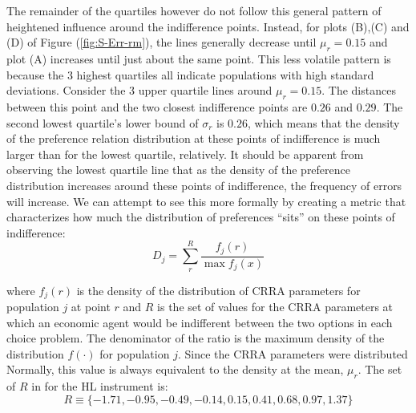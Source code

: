 \documentclass[11pt,a4paper]{article} %
\providecommand{\DIFaddbegin}{} %
\providecommand{\DIFaddend}{} %
\providecommand{\DIFdelbegin}{} %
\providecommand{\DIFdelend}{} %
\newcommand{\DIFscaledelfig}{0.5}
\newlength{\DIFdelgraphicswidth} %
\newlength{\DIFdelgraphicsheight} %
\newcommand{\DIFaddincludegraphics}[2][]{{\color{blue}\fbox{\DIFOincludegraphics[#1]{#2}}}} %
\newcommand{\DIFdelincludegraphics}[2][]{%
\sbox{\DIFdelgraphicsbox}{\DIFOincludegraphics[#1]{#2}}%
\settoboxwidth{\DIFdelgraphicswidth}{\DIFdelgraphicsbox} %
\settoboxtotalheight{\DIFdelgraphicsheight}{\DIFdelgraphicsbox} %
\scalebox{\DIFscaledelfig}{%
\parbox[b]{\DIFdelgraphicswidth}{\usebox{\DIFdelgraphicsbox}\\[-\baselineskip] \rule{\DIFdelgraphicswidth}{0em}}\llap{\resizebox{\DIFdelgraphicswidth}{\DIFdelgraphicsheight}{%
\setlength{\unitlength}{\DIFdelgraphicswidth}%
\begin{picture}(1,1)%
\thicklines\linethickness{2pt} %
{\color[rgb]{1,0,0}\put(0,0){\framebox(1,1){}}}%
{\color[rgb]{1,0,0}\put(0,0){\line( 1,1){1}}}%
{\color[rgb]{1,0,0}\put(0,1){\line(1,-1){1}}}%
\end{picture}%
}\hspace*{3pt}}} %
} %
\DeclareRobustCommand{\DIFaddbegin}{\DIFOaddbegin \let\includegraphics\DIFaddincludegraphics} %
\DeclareRobustCommand{\DIFaddend}{\DIFOaddend \let\includegraphics\DIFOincludegraphics} %
\DeclareRobustCommand{\DIFdelbegin}{\DIFOdelbegin \let\includegraphics\DIFdelincludegraphics} %
\DeclareRobustCommand{\DIFdelend}{\DIFOaddend \let\includegraphics\DIFOincludegraphics} %
\begin{document}
\addtocounter{footnote}{-1}

The remainder of the quartiles however do not follow this general pattern of heightened influence around the indifference points.
Instead, for plots (B),(C) and (D) of Figure (\ref{fig:S-Err-rm}), the lines generally decrease until $\mu_r = 0.15$ and plot (A) increases until just about the same point.
This less volatile pattern is because the 3 highest quartiles all indicate populations with high standard deviations.
Consider the 3 upper quartile lines around $\mu_r = 0.15$.
The distances between this point and the two closest indifference points are $0.26$ and $0.29$.
The second lowest quartile's lower bound of $\sigma_r$ is $0.26$, which means that the density of the preference relation distribution at these points of indifference is much larger than for the lowest quartile, relatively.
It should be apparent from observing the lowest quartile line that as the density of the preference distribution increases around these points of indifference, the frequency of errors will increase.
We can attempt to see this more formally by creating a metric that characterizes how much the distribution of preferences \enquote{sits} on these points of indifference:
\begin{equation}
	\DIFdelbegin %
\DIFdelend \DIFaddbegin \label{eq:Dstat}
	\DIFaddend D_j = \sum_r^R \frac{f_j(r)}{\max f_j(x)}
\end{equation}

\noindent where $f_j(r)$ is the density of the distribution of CRRA parameters for population $j$ at point $r$ and $R$ is the set of values for the CRRA parameters at which an economic agent would be indifferent between the two options in each choice problem.
The denominator of the ratio is the maximum density of the distribution $f(\cdot)$ for population $j$.
Since the CRRA parameters were distributed Normally, this value is always equivalent to the density at the mean, $\mu_r$.
The set of $R$ in for the HL instrument is:
\begin{equation}
	R \equiv \{-1.71, -0.95, -0.49, -0.14, 0.15, 0.41, 0.68, 0.97, 1.37\}
\end{equation}
\end{document}
